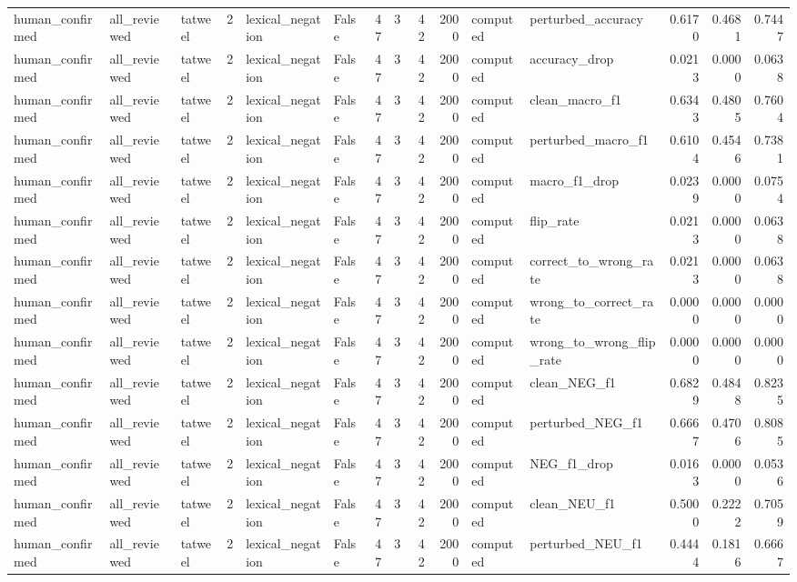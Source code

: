 \begin{tabular}{lllrllrrrrllrrr}
human_confirmed & all_reviewed & tatweel & 2 & lexical_negation & False & 47 & 3 & 42 & 2000 & computed & perturbed_accuracy & 0.6170 & 0.4681 & 0.7447 \\
human_confirmed & all_reviewed & tatweel & 2 & lexical_negation & False & 47 & 3 & 42 & 2000 & computed & accuracy_drop & 0.0213 & 0.0000 & 0.0638 \\
human_confirmed & all_reviewed & tatweel & 2 & lexical_negation & False & 47 & 3 & 42 & 2000 & computed & clean_macro_f1 & 0.6343 & 0.4805 & 0.7604 \\
human_confirmed & all_reviewed & tatweel & 2 & lexical_negation & False & 47 & 3 & 42 & 2000 & computed & perturbed_macro_f1 & 0.6104 & 0.4546 & 0.7381 \\
human_confirmed & all_reviewed & tatweel & 2 & lexical_negation & False & 47 & 3 & 42 & 2000 & computed & macro_f1_drop & 0.0239 & 0.0000 & 0.0754 \\
human_confirmed & all_reviewed & tatweel & 2 & lexical_negation & False & 47 & 3 & 42 & 2000 & computed & flip_rate & 0.0213 & 0.0000 & 0.0638 \\
human_confirmed & all_reviewed & tatweel & 2 & lexical_negation & False & 47 & 3 & 42 & 2000 & computed & correct_to_wrong_rate & 0.0213 & 0.0000 & 0.0638 \\
human_confirmed & all_reviewed & tatweel & 2 & lexical_negation & False & 47 & 3 & 42 & 2000 & computed & wrong_to_correct_rate & 0.0000 & 0.0000 & 0.0000 \\
human_confirmed & all_reviewed & tatweel & 2 & lexical_negation & False & 47 & 3 & 42 & 2000 & computed & wrong_to_wrong_flip_rate & 0.0000 & 0.0000 & 0.0000 \\
human_confirmed & all_reviewed & tatweel & 2 & lexical_negation & False & 47 & 3 & 42 & 2000 & computed & clean_NEG_f1 & 0.6829 & 0.4848 & 0.8235 \\
human_confirmed & all_reviewed & tatweel & 2 & lexical_negation & False & 47 & 3 & 42 & 2000 & computed & perturbed_NEG_f1 & 0.6667 & 0.4706 & 0.8085 \\
human_confirmed & all_reviewed & tatweel & 2 & lexical_negation & False & 47 & 3 & 42 & 2000 & computed & NEG_f1_drop & 0.0163 & 0.0000 & 0.0536 \\
human_confirmed & all_reviewed & tatweel & 2 & lexical_negation & False & 47 & 3 & 42 & 2000 & computed & clean_NEU_f1 & 0.5000 & 0.2222 & 0.7059 \\
human_confirmed & all_reviewed & tatweel & 2 & lexical_negation & False & 47 & 3 & 42 & 2000 & computed & perturbed_NEU_f1 & 0.4444 & 0.1816 & 0.6667 \\

\end{tabular}
